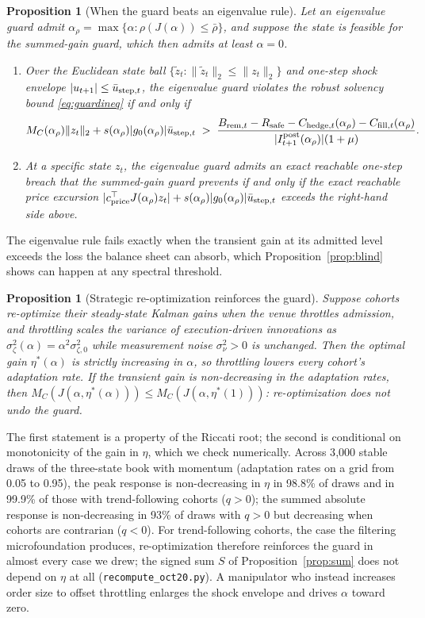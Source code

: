 \documentclass[12pt]{article}
\newtheorem{proposition}[theorem]{Proposition}
\theoremstyle{definition}
\theoremstyle{remark}
\begin{document}
\begin{proposition}[When the guard beats an eigenvalue rule]\label{prop:dominance}
Let an eigenvalue guard admit $\alpha_\rho=\max\{\alpha:\rho(J(\alpha))\le\bar\rho\}$, and suppose the state is feasible for the summed-gain guard, which then admits at least $\alpha=0$.
\begin{enumerate}[label=(\roman*)]
\item Over the Euclidean state ball $\{\tilde z_t:\|\tilde z_t\|_2\le\|z_t\|_2\}$ and one-step shock envelope $|u_{t+1}|\le\bar u_{{\rm step},t}$, the eigenvalue guard violates the robust solvency bound \eqref{eq:guardineq} if and only if
\[
M_C(\alpha_\rho)\|z_t\|_2+s(\alpha_\rho)|g_0(\alpha_\rho)|\bar u_{{\rm step},t}\;>\;\frac{B_{{\rm rem},t}-R_{\rm safe}-C_{{\rm hedge},t}(\alpha_\rho)-C_{{\rm fill},t}(\alpha_\rho)}{|I^{\rm post}_{t+1}(\alpha_\rho)|(1+\mu)} .
\]
\item At a specific state $z_t$, the eigenvalue guard admits an exact reachable one-step breach that the summed-gain guard prevents if and only if the exact reachable price excursion $|c^\top_{\rm price}J(\alpha_\rho)z_t|+s(\alpha_\rho)|g_0(\alpha_\rho)|\bar u_{{\rm step},t}$ exceeds the right-hand side above.
\end{enumerate}
\end{proposition}

The eigenvalue rule fails exactly when the transient gain at its admitted level exceeds the loss the balance sheet can absorb, which Proposition~\ref{prop:blind} shows can happen at any spectral threshold.

\begin{proposition}[Strategic re-optimization reinforces the guard]\label{prop:lucas}
Suppose cohorts re-optimize their steady-state Kalman gains when the venue throttles admission, and throttling scales the variance of execution-driven innovations as $\sigma_\zeta^2(\alpha)=\alpha^2\sigma_{\zeta,0}^2$ while measurement noise $\sigma_\nu^2>0$ is unchanged. Then the optimal gain $\eta^*(\alpha)$ is strictly increasing in $\alpha$, so throttling lowers every cohort's adaptation rate. If the transient gain is non-decreasing in the adaptation rates, then $M_C(J(\alpha,\eta^*(\alpha)))\le M_C(J(\alpha,\eta^*(1)))$: re-optimization does not undo the guard.
\end{proposition}

The first statement is a property of the Riccati root; the second is conditional on monotonicity of the gain in $\eta$, which we check numerically. Across 3{,}000 stable draws of the three-state book with momentum (adaptation rates on a grid from 0.05 to 0.95), the peak response is non-decreasing in $\eta$ in 98.8\% of draws and in 99.9\% of those with trend-following cohorts ($q>0$); the summed absolute response is non-decreasing in 93\% of draws with $q>0$ but decreasing when cohorts are contrarian ($q<0$). For trend-following cohorts, the case the filtering microfoundation produces, re-optimization therefore reinforces the guard in almost every case we drew; the signed sum $S$ of Proposition~\ref{prop:sum} does not depend on $\eta$ at all (\texttt{recompute\_oct20.py}). A manipulator who instead increases order size to offset throttling enlarges the shock envelope and drives $\alpha$ toward zero.
\end{document}
